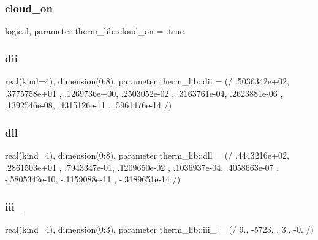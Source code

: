 \mbox{\label{namespacetherm__lib_a7761745573e57bcf109498771693bc48}} 
\subsubsection{\texorpdfstring{cloud\+\_\+on}{cloud\_on}}
{\footnotesize\ttfamily logical, parameter therm\+\_\+lib\+::cloud\+\_\+on = .true.}

\mbox{\label{namespacetherm__lib_ac6f7b02070a3ef627b731ecd1b7afb1a}} 
\subsubsection{\texorpdfstring{dii}{dii}}
{\footnotesize\ttfamily real(kind=4), dimension(0\+:8), parameter therm\+\_\+lib\+::dii = (/ .\+5036342e+02, .\+3775758e+01 , .\+1269736e+00, .\+2503052e-\/02 , .\+3163761e-\/04, .\+2623881e-\/06 , .\+1392546e-\/08, .\+4315126e-\/11 , .\+5961476e-\/14 /)}

\mbox{\label{namespacetherm__lib_acfbfc8c511318be0ac3c435bec00f876}} 
\subsubsection{\texorpdfstring{dll}{dll}}
{\footnotesize\ttfamily real(kind=4), dimension(0\+:8), parameter therm\+\_\+lib\+::dll = (/ .\+4443216e+02, .\+2861503e+01 , .\+7943347e-\/01, .\+1209650e-\/02 , .\+1036937e-\/04, .\+4058663e-\/07 , -\/.\+5805342e-\/10, -\/.\+1159088e-\/11 , -\/.\+3189651e-\/14 /)}

\mbox{\label{namespacetherm__lib_af62776bc58906738f54b9b6be6b672d6}} 
\subsubsection{\texorpdfstring{iii\+\_}{iii\_7}}
{\footnotesize\ttfamily real(kind=4), dimension(0\+:3), parameter therm\+\_\+lib\+::iii\+\_ = (/ 9., -\/5723. , 3., -\/0. /)}

